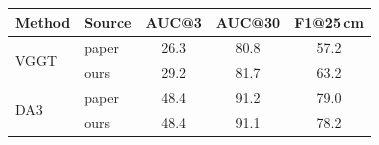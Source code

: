 \begin{tabular}{llccc}
\toprule
Method & Source & AUC@3 & AUC@30 & F1@25\,cm \\
\midrule
\multirow{2}{*}{VGGT} & paper & 26.3 & 80.8 & 57.2 \\
 & ours & 29.2 & 81.7 & 63.2 \\
\multirow{2}{*}{DA3} & paper & 48.4 & 91.2 & 79.0 \\
 & ours & 48.4 & 91.1 & 78.2 \\
\bottomrule
\end{tabular}
